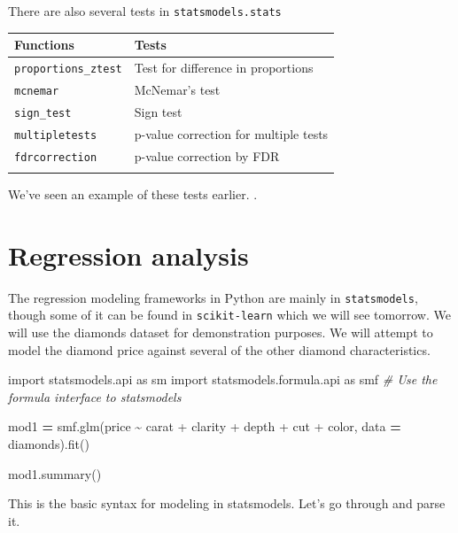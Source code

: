 \documentclass[
  letterpaper,
]{scrbook}
\newenvironment{Shaded}{\begin{snugshade}}{\end{snugshade}}
\newcommand{\CommentTok}[1]{\textcolor[rgb]{0.56,0.35,0.01}{\textit{#1}}}
\newcommand{\ImportTok}[1]{#1}
\newcommand{\NormalTok}[1]{#1}
\newcommand{\OperatorTok}[1]{\textcolor[rgb]{0.81,0.36,0.00}{\textbf{#1}}}
\newcommand{\StringTok}[1]{\textcolor[rgb]{0.31,0.60,0.02}{#1}}
\begin{document}
There are also several tests in \texttt{statsmodels.stats}

\begin{longtable}[]{@{}ll@{}}
\toprule
Functions & Tests\tabularnewline
\midrule
\endhead
\texttt{proportions\_ztest} & Test for difference in proportions\tabularnewline
\texttt{mcnemar} & McNemar's test\tabularnewline
\texttt{sign\_test} & Sign test\tabularnewline
\texttt{multipletests} & p-value correction for multiple tests\tabularnewline
\texttt{fdrcorrection} & p-value correction by FDR\tabularnewline
&\tabularnewline
\bottomrule
\end{longtable}

We've seen an example of these tests earlier. .

\hypertarget{regression-analysis}{%
\section{Regression analysis}\label{regression-analysis}}

The regression modeling frameworks in Python are mainly in \texttt{statsmodels}, though some of it can be found in \texttt{scikit-learn} which we will see tomorrow. We will use the diamonds dataset for demonstration purposes. We will attempt to model the diamond price against several of the other diamond characteristics.

\begin{Shaded}
\begin{Highlighting}[]
\ImportTok{import}\NormalTok{ statsmodels.api }\ImportTok{as}\NormalTok{ sm}
\ImportTok{import}\NormalTok{ statsmodels.formula.api }\ImportTok{as}\NormalTok{ smf }\CommentTok{\# Use the formula interface to statsmodels}

\NormalTok{mod1 }\OperatorTok{=}\NormalTok{ smf.glm(}\StringTok{\textquotesingle{}price \textasciitilde{} carat + clarity + depth + cut + color\textquotesingle{}}\NormalTok{, data }\OperatorTok{=}\NormalTok{ diamonds).fit()}
\end{Highlighting}
\end{Shaded}

\begin{Shaded}
\begin{Highlighting}[]
\NormalTok{mod1.summary()}
\end{Highlighting}
\end{Shaded}

This is the basic syntax for modeling in statsmodels. Let's go through and parse it.
\end{document}

